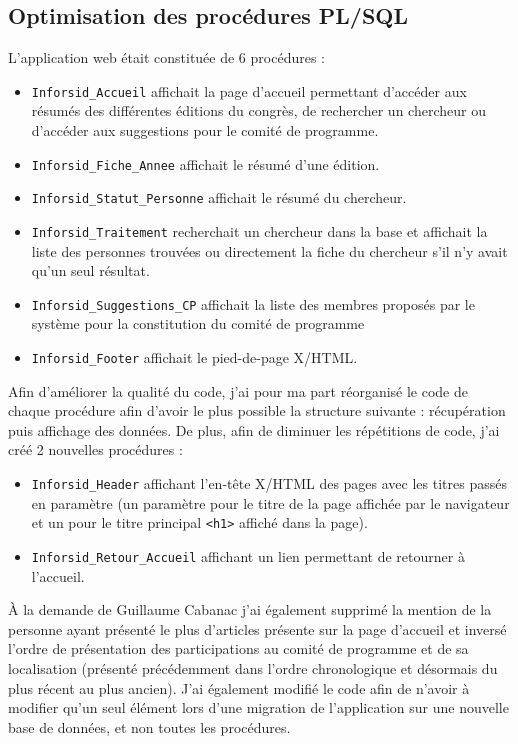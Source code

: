 		\subsection{Optimisation des procédures PL/SQL}
			L'application web était constituée de 6 procédures :
			\begin{itemize}
				\item \texttt{Inforsid\_Accueil} affichait la page d'accueil permettant d'accéder aux résumés des différentes éditions du congrès, de rechercher un chercheur ou d'accéder aux suggestions pour le comité de programme.
				\item \texttt{Inforsid\_Fiche\_Annee} affichait le résumé d'une édition.
				\item \texttt{Inforsid\_Statut\_Personne} affichait le résumé du chercheur.
				\item \texttt{Inforsid\_Traitement} recherchait un chercheur dans la base et affichait la liste des personnes trouvées ou directement la fiche du chercheur s'il n'y avait qu'un seul résultat.
				\item \texttt{Inforsid\_Suggestions\_CP} affichait la liste des membres proposés par le système pour la constitution du comité de programme
				\item \texttt{Inforsid\_Footer} affichait le pied-de-page X/HTML.
			\end{itemize}

			Afin d'améliorer la qualité du code, j'ai pour ma part réorganisé le code de chaque procédure afin d'avoir le plus possible la structure suivante : récupération puis affichage des données. De plus, afin de diminuer les répétitions de code, j'ai créé 2 nouvelles procédures :
			\begin{itemize}
				\item \texttt{Inforsid\_Header} affichant l'en-tête X/HTML des pages avec les titres passés en paramètre (un paramètre pour le titre de la page affichée par le navigateur et un pour le titre principal \texttt{<h1>} affiché dans la page).
				\item \texttt{Inforsid\_Retour\_Accueil} affichant un lien permettant de retourner à l'accueil.
			\end{itemize}
			
			À la demande de Guillaume Cabanac j'ai également supprimé la mention de la personne ayant présenté le plus d'articles présente sur la page d'accueil et inversé l'ordre de présentation des participations au comité de programme et de sa localisation (présenté précédemment dans l'ordre chronologique et désormais du plus récent au plus ancien). J'ai également modifié le code afin de n'avoir à modifier qu'un seul élément lors d'une migration de l'application sur une nouvelle base de données, et non toutes les procédures.
			

